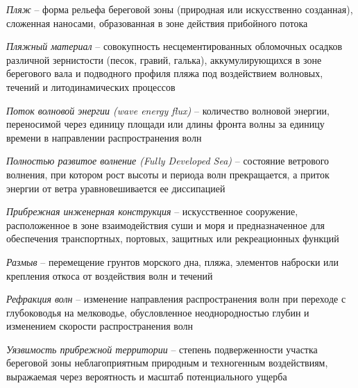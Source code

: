 \noindent \textit{Пляж} -- форма рельефа береговой зоны (природная или искусственно созданная), сложенная наносами, образованная в зоне действия прибойного потока \cite{gost_r_59241_2020}

\noindent \textit{Пляжный материал} -- совокупность несцементированных обломочных осадков различной зернистости (песок, гравий, галька), аккумулирующихся в зоне берегового вала и подводного профиля пляжа под воздействием волновых, течений и литодинамических процессов


\noindent \textit{Поток волновой энергии (wave energy flux)} -- количество волновой энергии, переносимой через единицу площади или длины фронта волны за единицу времени в направлении распространения волн

\noindent \textit{Полностью развитое волнение (Fully Developed Sea)} -- состояние ветрового волнения, при котором рост высоты и периода волн прекращается, а приток энергии от ветра уравновешивается ее диссипацией

\noindent \textit{Прибрежная инженерная конструкция} -- искусственное сооружение, расположенное в зоне взаимодействия суши и моря и предназначенное для обеспечения транспортных, портовых, защитных или рекреационных функций

\noindent \textit{Размыв} -- перемещение грунтов морского дна, пляжа, элементов наброски или крепления откоса от воздействия волн и течений \cite{gost_r_59241_2020}

\noindent \textit{Рефракция волн} -- изменение направления распространения волн при переходе с глубоководья на мелководье, обусловленное неоднородностью глубин и изменением скорости распространения волн

\noindent \textit{Уязвимость прибрежной территории} -- степень подверженности участка береговой зоны неблагоприятным природным и техногенным воздействиям, выражаемая через вероятность и масштаб потенциального ущерба
